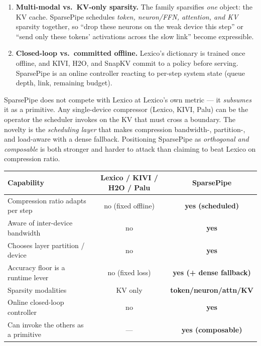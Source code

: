 \documentclass[11pt]{article}
\newcommand{\term}[1]{\textbf{\color{accent!85!black}#1}}
\begin{document}
\begin{enumerate}[leftmargin=1.6em,itemsep=3pt]
\item \term{Multi-modal vs.\ KV-only sparsity.} The family sparsifies \emph{one} object: the
KV cache. SparsePipe schedules \emph{token, neuron/FFN, attention, and KV} sparsity together,
so ``drop these neurons on the weak device this step'' or ``send only these tokens'
activations across the slow link'' become expressible.

\item \term{Closed-loop vs.\ committed offline.} Lexico's dictionary is trained once offline,
and KIVI, H2O, and SnapKV commit to a policy before serving. SparsePipe is an online
controller reacting to per-step system state (queue depth, link, remaining budget).
\end{enumerate}

\begin{claimbox}
SparsePipe does not compete with Lexico at Lexico's own metric --- it \emph{subsumes} it as a
primitive. Any single-device compressor (Lexico, KIVI, Palu) can be the operator the scheduler
invokes on the KV that must cross a boundary. The novelty is the \emph{scheduling layer} that
makes compression bandwidth-, partition-, and load-aware with a dense fallback. Positioning
SparsePipe as \emph{orthogonal and composable} is both stronger and harder to attack than
claiming to beat Lexico on compression ratio.
\end{claimbox}

\begin{center}
\renewcommand{\arraystretch}{1.28}
\small
\begin{tabular}{@{}p{4.7cm}cc@{}}
\toprule
\textbf{Capability} & \textbf{Lexico / KIVI / H2O / Palu} & \textbf{SparsePipe} \\
\midrule
Compression ratio adapts per step & no (fixed offline) & \textbf{yes (scheduled)} \\
Aware of inter-device bandwidth & no & \textbf{yes} \\
Chooses layer partition / device & no & \textbf{yes} \\
Accuracy floor is a runtime lever & no (fixed loss) & \textbf{yes (+ dense fallback)} \\
Sparsity modalities & KV only & \textbf{token/neuron/attn/KV} \\
Online closed-loop controller & no & \textbf{yes} \\
Can invoke the others as a primitive & --- & \textbf{yes (composable)} \\
\bottomrule
\end{tabular}
\end{center}
\end{document}
